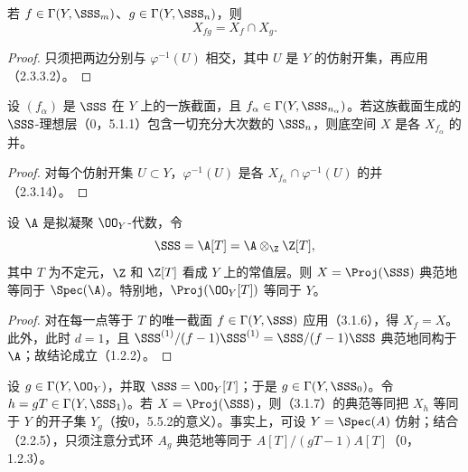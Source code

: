 若 $f\in\Gamma(Y,\SSS_m)$、$g\in\Gamma(Y,\SSS_n)$，则
\begin{equation}\tag{3.1.5.1}X_{fg}=X_f\cap X_g.\end{equation}
\begin{proof}
只须把两边分别与 $\varphi^{-1}(U)$ 相交，其中 $U$ 是 $Y$ 的仿射开集，再应用（2.3.3.2）。
\end{proof}

设 $(f_\alpha)$ 是 $\SSS$ 在 $Y$ 上的一族截面，且 $f_\alpha\in\Gamma(Y,\SSS_{n_\alpha})$。若这族截面生成的 $\SSS$-理想层（0，5.1.1）包含一切充分大次数的 $\SSS_n$，则底空间 $X$ 是各 $X_{f_\alpha}$ 的并。
\begin{proof}
对每个仿射开集 $U\subset Y$，$\varphi^{-1}(U)$ 是各 $X_{f_\alpha}\cap\varphi^{-1}(U)$ 的并（2.3.14）。
\end{proof}

设 $\A$ 是拟凝聚 $\OO_Y$-代数，令
\[
\SSS=\A[T]=\A\otimes_{\Z}\Z[T],
\]
其中 $T$ 为不定元，$\Z$ 和 $\Z[T]$ 看成 $Y$ 上的常值层。则 $X=\Proj(\SSS)$ 典范地等同于 $\Spec(\A)$。特别地，$\Proj(\OO_Y[T])$ 等同于 $Y$。
\begin{proof}
对在每一点等于 $T$ 的唯一截面 $f\in\Gamma(Y,\SSS)$ 应用（3.1.6），得 $X_f=X$。此外，此时 $d=1$，且
$\SSS^{(1)}/(f-1)\SSS^{(1)}=\SSS/(f-1)\SSS$ 典范地同构于 $\A$；故结论成立（1.2.2）。
\end{proof}
设 $g\in\Gamma(Y,\OO_Y)$，并取 $\SSS=\OO_Y[T]$；于是 $g\in\Gamma(Y,\SSS_0)$。令
$h=gT\in\Gamma(Y,\SSS_1)$。若 $X=\Proj(\SSS)$，则（3.1.7）的典范等同把 $X_h$ 等同于 $Y$ 的开子集 $Y_g$（按0，5.5.2的意义）。事实上，可设 $Y=\Spec(A)$ 仿射；结合（2.2.5），只须注意分式环 $A_g$ 典范地等同于 $A[T]/(gT-1)A[T]$（0，1.2.3）。

